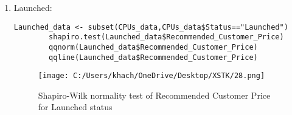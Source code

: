 \documentclass[a4paper]{article}
\begin{document}
\begin{enumerate}
\begin{figure}[htbp]
		\end{figure}
		\begin{itemize}
			\item Null hypothesis:
			\( H_0 \): The recommended customer price of End of life status follows a normal distribution.
			\item Alternative hypothesis:
			\( H_1 \): The recommended customer price of End of life status does not follow a normal distribution.
			\item Since the p-value < \(2.2 \times 10^{-16}\) (which is less than the significance level of 5\%), we reject the null hypothesis. Therefore, we conclude that the recommended customer price of servers does not follow a normal distribution.
			\begin{figure}[htbp]
				\centering
				\begin{adjustbox}{width=0.7\textwidth, frame}
					\texttt{[image: C:/Users/khach/OneDrive/Desktop/XSTK/27.png]}
				\end{adjustbox}
				\captionsetup{justification=centering}
				\vspace{0.5cm}
				\caption{Illustration of contribution of Recommended Customer Price for End of life status}
			\end{figure}
		\end{itemize}
		\newpage
		\item Launched:
		\begin{lstlisting}[frame=single, backgroundcolor=\color{gray!10}, breaklines=true, columns=fullflexible]
		Launched_data <- subset(CPUs_data,CPUs_data$Status=="Launched")
		shapiro.test(Launched_data$Recommended_Customer_Price)
		qqnorm(Launched_data$Recommended_Customer_Price)
		qqline(Launched_data$Recommended_Customer_Price)
		\end{lstlisting}
		\begin{figure}[htbp]
			\centering
			\begin{adjustbox}{width=0.7\textwidth, frame}
				\texttt{[image: C:/Users/khach/OneDrive/Desktop/XSTK/28.png]}
			\end{adjustbox}
			\captionsetup{justification=centering}
			\vspace{0.5cm}
			\caption{Shapiro-Wilk normality test of Recommended Customer Price for Launched status}
		\end{figure}
		

\end{enumerate}
\end{document}
